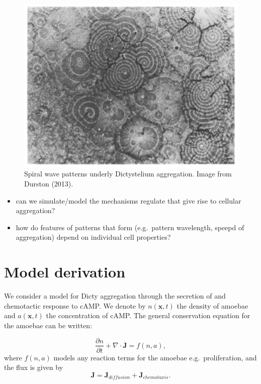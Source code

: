 \documentclass[
  letterpaper,
  DIV=11,
  numbers=noendperiod]{scrreprt}
\providecommand{\tightlist}{%
  \setlength{\itemsep}{0pt}\setlength{\parskip}{0pt}}\usepackage{longtable,booktabs,array}
\theoremstyle{definition}
\theoremstyle{plain}
\theoremstyle{plain}
\theoremstyle{remark}
\begin{document}
\begin{figure}

{\centering \includegraphics{CG-14-355_F2.jpg}

}

\caption{\label{fig-dicty_spiral}Spiral wave patterns underly
Dictystelium aggregation. Image from Durston (2013).}

\end{figure}

\begin{itemize}
\tightlist
\item
  can we simulate/model the mechanisms regulate that give rise to
  cellular aggregation?
\item
  how do features of patterns that form (e.g.~pattern wavelength, speepd
  of aggregation) depend on individual cell properties?
\end{itemize}

\hypertarget{model-derivation}{%
\section{Model derivation}\label{model-derivation}}

We consider a model for Dicty aggregation through the secretion of and
chemotactic response to cAMP. We denote by \(n({\mathbf{x}}, t)\) the
density of amoebae and \(a({\mathbf{x}}, t)\) the concentration of cAMP.
The general conservation equation for the amoebae can be written:

\[
\frac{\partial n}{\partial  t} + \nabla \cdot {\mathbf{J}} = f(n,a),
\] where \(f(n,a)\) models any reaction terms for the amoebae
e.g.~proliferation, and the flux is given by \[
{\mathbf{J}} = {\mathbf{J}}_{diffusion} + {\mathbf{J}}_{chemotaxis}.
\]
\end{document}
